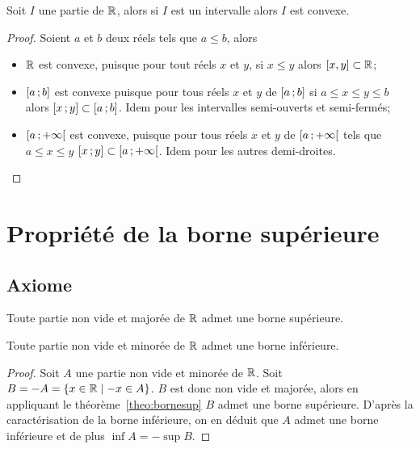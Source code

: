 \begin{theo}
  \label{theo:partieconvexe1}
  Soit \(I\) une partie de \(\mathbb{R}\), alors si \(I\) est un intervalle alors \(I\) est convexe.
\end{theo}
\begin{proof}
  Soient \(a\) et \(b\) deux réels tels que \(a\leqslant b\), alors
  \begin{itemize}
  \item \(\mathbb{R}\) est convexe, puisque pour tout réels \(x\) et \(y\), si \(x\leqslant y\) alors \([x,y]\subset \mathbb{R}\);
  \item \(\left[ a \, ;  b \right]\) est convexe puisque pour tous réels \(x\) et \(y\) de \(\left[ a \, ;  b \right]\) si \(a\leqslant x\leqslant y\leqslant b\) alors \(\left[ x \, ;  y \right]\subset \left[ a \, ;  b \right]\). Idem pour les intervalles semi-ouverts et semi-fermés;
  \item \(\left[ a \, ;  +\infty \right[\) est convexe, puisque pour tous réels \(x\) et \(y\) de \(\left[ a \, ;  +\infty \right[\) tels que \(a\leqslant x\leqslant y\) \(\left[ x \, ;  y \right]\subset \left[ a \, ;  +\infty \right[\). Idem pour les autres demi-droites.
  \end{itemize}
\end{proof}

\section{Propriété de la borne supérieure}

\subsection{Axiome}

\begin{theo}
  \label{theo:bornesup}
  Toute partie non vide et majorée de \(\mathbb{R}\) admet une borne supérieure.
\end{theo}
\begin{theo}
  Toute partie non vide et minorée de \(\mathbb{R}\) admet une borne inférieure.
\end{theo}
\begin{proof}
  Soit \(A\) une partie non vide et minorée de \(\mathbb{R}\). Soit \(B=-A=\left\{x\in \mathbb{R}\mathrel{}\middle|\mathrel{}-x \in A\right\}\). \(B\) est donc non vide et majorée, alors en appliquant le théorème~\ref{theo:bornesup} \(B\) admet une borne supérieure. D'après la caractérisation de la borne inférieure, on en déduit que \(A\) admet une borne inférieure et de plus \(\inf A=-\sup B\).
\end{proof}

